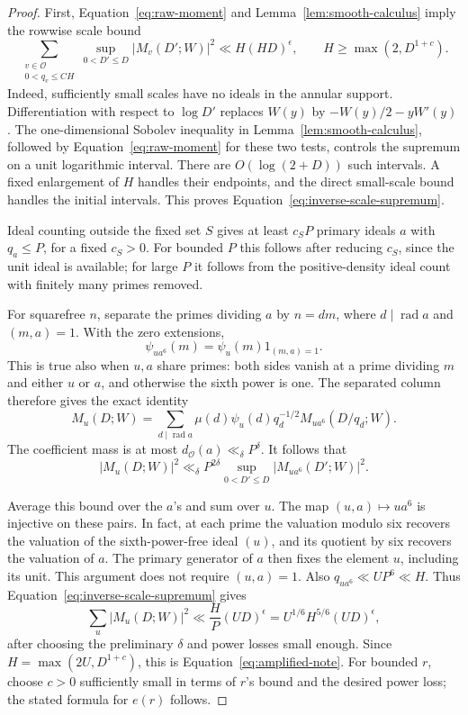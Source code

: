 \documentclass[11pt,a4paper]{article}
\numberwithin{equation}{section}
\numberwithin{figure}{section}
\theoremstyle{definition}
\theoremstyle{remark}
\begin{document}
\begin{proof}
First, Equation~\eqref{eq:raw-moment} and
Lemma~\ref{lem:smooth-calculus} imply the rowwise scale bound
\begin{equation}\label{eq:inverse-scale-supremum}
 \sum_{\substack{v\in\mathcal O\\0<q_v\le C H}}
       \sup_{0<D'\le D}|M_v(D';W)|^2
 \ll H(HD)^\epsilon,\qquad H\ge\max(2,D^{1+c}).
\end{equation}
Indeed, sufficiently small scales have no ideals in the annular
support.  Differentiation with respect to \(\log D'\) replaces
\(W(y)\) by \(-W(y)/2-yW'(y)\).  The one-dimensional Sobolev
inequality in Lemma~\ref{lem:smooth-calculus}, followed by
Equation~\eqref{eq:raw-moment} for these two tests, controls the
supremum on a unit logarithmic interval.  There are
\(O(\log(2+D))\) such intervals.  A fixed enlargement of \(H\)
handles their endpoints, and the direct small-scale bound handles
the initial intervals.  This proves
Equation~\eqref{eq:inverse-scale-supremum}.

Ideal counting outside the fixed set \(S\) gives at least \(c_S P\)
primary ideals \(a\) with \(q_a\le P\), for a fixed \(c_S>0\).
For bounded \(P\) this follows after reducing \(c_S\), since the
unit ideal is available; for large \(P\) it follows from the
positive-density ideal count with finitely many primes removed.

For squarefree \(n\), separate the primes dividing \(a\) by
\(n=dm\), where \(d\mid\operatorname{rad}a\) and \((m,a)=1\).
With the zero extensions,
\[
 \psi_{ua^6}(m)=\psi_u(m)1_{(m,a)=1}.
\]
This is true also when \(u,a\) share primes: both sides vanish
at a prime dividing \(m\) and either \(u\) or \(a\), and otherwise
the sixth power is one.  The separated column therefore gives the
exact identity
\begin{equation}\label{eq:sixth-power-column-identity}
 M_u(D;W)=\sum_{d\mid\operatorname{rad}a}
       \mu(d)\psi_u(d)q_d^{-1/2}M_{ua^6}(D/q_d;W).
\end{equation}
The coefficient mass is at most \(d_{\mathcal O}(a)\ll_\delta P^\delta\).
It follows that
\[
 |M_u(D;W)|^2\ll_\delta
 P^{2\delta}\sup_{0<D'\le D}|M_{ua^6}(D';W)|^2.
\]

Average this bound over the \(a\)'s and sum over \(u\).  The map
\((u,a)\mapsto ua^6\) is injective on these pairs.  In fact, at
each prime the valuation modulo six recovers the valuation of
the sixth-power-free ideal \((u)\), and its quotient by six
recovers the valuation of \(a\).  The primary generator of \(a\)
then fixes the element \(u\), including its unit.  This argument
does not require \((u,a)=1\).  Also
\(q_{ua^6}\ll UP^6\ll H\).  Thus
Equation~\eqref{eq:inverse-scale-supremum} gives
\[
 \sum_u|M_u(D;W)|^2
 \ll \frac HP(UD)^\epsilon
 =U^{1/6}H^{5/6}(UD)^\epsilon,
\]
after choosing the preliminary \(\delta\) and power losses small
enough.  Since \(H=\max(2U,D^{1+c})\), this is
Equation~\eqref{eq:amplified-note}.  For bounded \(r\), choose
\(c>0\) sufficiently small in terms of \(r\)'s bound and the
desired power loss; the stated formula for \(e(r)\) follows.


\end{proof}
\end{document}
